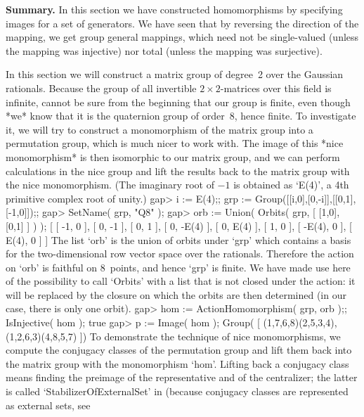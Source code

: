 {\bf  Summary.}   In this section   we  have constructed homomorphisms by
specifying images for a set of generators. We have seen that by reversing
the direction of  the mapping, we get  group general mappings, which need
not be single-valued (unless the mapping was injective) nor total (unless
the mapping was surjective).


In this  section we will construct  a matrix group   of degree~2 over the
Gaussian  rationals. Because    the  group of   all  invertible  $2\times
2$-matrices over this  field is infinite, {\GAP}  cannot be sure from the
beginning that our group is finite, even though *we*  know that it is the
quaternion group of order~8, hence finite. To investigate it, we will try
to construct a monomorphism of the matrix group into a permutation group,
which is much nicer to  work with. The  image of this *nice monomorphism*
is then  isomorphic to our matrix group,  and we can perform calculations
in the nice group and lift the results back  to the matrix group with the
nice monomorphism. (The  imaginary root of $-1$  is obtained as `E(4)', a
4th primitive complex root of unity.)
\beginexample
gap> i := E(4);; grp := Group([[i,0],[0,-i]],[[0,1],[-1,0]]);;
gap> SetName( grp, "Q8" );
gap> orb := Union( Orbits( grp, [ [1,0], [0,1] ] ) );
[ [ -1, 0 ], [ 0, -1 ], [ 0, 1 ], [ 0, -E(4) ], [ 0, E(4) ], [ 1, 0 ], 
  [ -E(4), 0 ], [ E(4), 0 ] ]
\endexample
The list `orb' is the union of orbits  under `grp' which contains a basis
for  the two-dimensional row vector  space  over the rationals. Therefore
the action on `orb' is  faithful on 8~points, and  hence `grp' is finite.
We  have made use here  of the possibility to  call  `Orbits' with a list
that is  not closed  under  the action:  it  will be  replaced by  the
closure  on which the  orbits are then determined  (in our case, there is
only one orbit).
\beginexample
gap> hom := ActionHomomorphism( grp, orb );; IsInjective( hom );
true
gap> p := Image( hom );
Group( [ (1,7,6,8)(2,5,3,4), (1,2,6,3)(4,8,5,7) ])
\endexample
To  demonstrate the technique  of   nice  monomorphisms, we  compute  the
conjugacy classes of the  permutation group and  lift them back into  the
matrix group with the monomorphism `hom'. Lifting  back a conjugacy class
means finding the preimage of  the representative and of the centralizer;
the latter  is   called  `StabilizerOfExternalSet'   in {\GAP}   (because
conjugacy  classes are represented as   external sets, see
